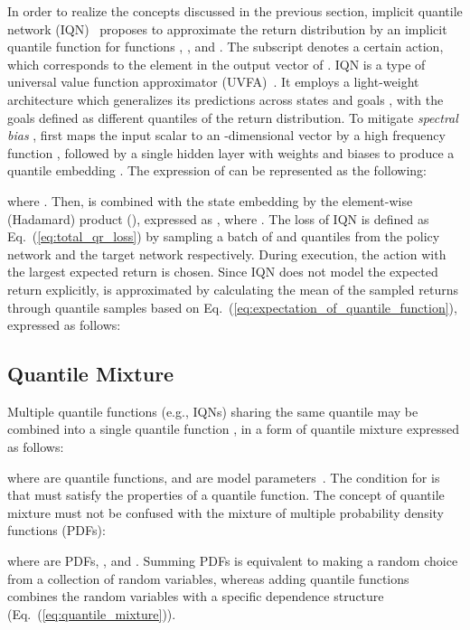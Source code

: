 \documentclass[twoside,11pt]{article}
\begin{document}
In order to realize the concepts discussed in the previous section, implicit quantile network (IQN)~\citep{Dabney2018IQN} proposes to approximate the return distribution  by an implicit quantile function  for functions , , and . The subscript  denotes a certain action, which corresponds to the  element in the output vector of . IQN is a type of universal value function approximator (UVFA)~\citep{Schaul2015UVFA}.  It employs a light-weight architecture which generalizes its predictions across states  and goals , with the goals defined as different quantiles of the return distribution.
To mitigate \textit{spectral bias} \citep{rahaman2019spectral},  first maps the input scalar  to an -dimensional vector by a high frequency function , followed by a single hidden layer with weights  and biases  to produce a quantile embedding . The expression of  can be represented as the following:

where . Then,  is combined with the state embedding  by the element-wise (Hadamard) product (), expressed as , where . The loss of IQN is defined as Eq.~(\ref{eq:total_qr_loss}) by sampling a batch of  and  quantiles from the policy network and the target network respectively.
During execution, the action with the largest expected return  is chosen. Since IQN does not model the expected return explicitly,  is approximated by calculating the mean of the sampled returns through  quantile samples  based on Eq.~(\ref{eq:expectation_of_quantile_function}), expressed as follows:




\subsection{Quantile Mixture}
\label{subsec:background_quantile_mixture}

Multiple quantile functions (e.g., IQNs) sharing the same quantile  may be combined into a single quantile function , in a form of quantile mixture expressed as follows:

where  are quantile functions, and  are model parameters~\citep{Karvanen2006QuantileMixture}. The condition for   is that  must satisfy the properties of a quantile function.
The concept of quantile mixture must not be confused with the mixture of multiple probability density functions (PDFs):

where  are PDFs, , and . Summing PDFs is equivalent to making a random choice from a collection of random variables, whereas adding quantile functions combines the random variables with a specific dependence structure (Eq.~(\ref{eq:quantile_mixture})).
\end{document}
